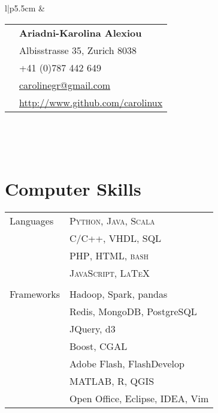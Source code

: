 \documentclass[10pt]{article} %
\begin{document}
\begin{minipage}[t]{0.44\textwidth} %
\vspace{0pt} %


\colorbox{shade}{\textcolor{text1}{
        \begin{tabular}{l|p{5.5cm}}
             &
        \begin{tabular}{l|p{5cm}}
    \raisebox{0pt}{\Smiley} & \textbf{Ariadni-Karolina Alexiou} \\ %
    \raisebox{-1pt}{\textifsymbol{18}} & Albisstrasse 35, Zurich 8038 \\ %
    \raisebox{-1pt}{\Mobilefone} & +41 (0)787 442 649 \\ %
    \raisebox{-1pt}{\Letter} & \href{mailto:carolinegr@gmail.com}{carolinegr@gmail.com} \\ %
    \Keyboard & \href{http://www.github.com/carolinux}{http://www.github.com/carolinux} \\ %
        \end{tabular}  \\ %
\end{tabular}
}
}\\[10pt]






\section{Computer Skills} 

\begin{tabular}{ll}
Languages
& \textsc{Python}, \textsc{Java}, \textsc{Scala} \\
& \textsc{C/C++}, \textsc{VHDL}, \textsc{SQL} \\
& \textsc{PHP}, \textsc{HTML}, \textsc{bash} \\
& \textsc{JavaScript}, \textsc{\LaTeX} \\
&\\
Frameworks
& Hadoop, Spark, pandas \\
& Redis, MongoDB, PostgreSQL \\
& JQuery, d3 \\
& Boost, CGAL \\
& Adobe Flash, FlashDevelop \\
& MATLAB, R, QGIS \\
& Open Office, Eclipse, IDEA, Vim\\



\end{tabular}
\end{minipage}
\end{document}
